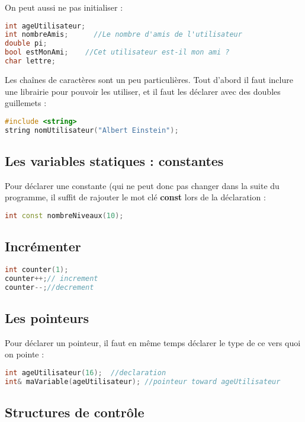 \documentclass[a4paper,twoside]{article}
\begin{document}
On peut aussi ne pas initialiser :
\begin{lstlisting}[language=C++]
int ageUtilisateur;
int nombreAmis;      //Le nombre d'amis de l'utilisateur
double pi;
bool estMonAmi;    //Cet utilisateur est-il mon ami ?
char lettre;
\end{lstlisting}

\bigskip

Les chaînes de caractères sont un peu particulières. Tout d'abord il faut inclure une librairie pour pouvoir les utiliser, et 
il faut les déclarer avec des doubles guillemets : 
\begin{lstlisting}[language=C++]
#include <string>
string nomUtilisateur("Albert Einstein");
\end{lstlisting}

\subsection{Les variables statiques : constantes}

Pour déclarer une constante (qui ne peut donc pas changer dans la suite du programme, il suffit de rajouter le mot clé 
\textbf{const} lors de la déclaration :
\begin{lstlisting}[language=C++]
int const nombreNiveaux(10);
\end{lstlisting}

\subsection{Incrémenter}
\begin{lstlisting}[language=C++]
int counter(1);
counter++;// increment
counter--;//decrement
\end{lstlisting}

\subsection{Les pointeurs}\label{sec:pointeurs}
Pour déclarer un pointeur, il faut en même temps déclarer le type de ce vers quoi on pointe : 
\begin{lstlisting}[language=C++]
int ageUtilisateur(16);  //declaration
int& maVariable(ageUtilisateur); //pointeur toward ageUtilisateur
\end{lstlisting}

\subsection{Structures de contrôle}
\end{document}
